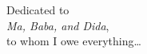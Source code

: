 \thispagestyle{empty}
{}

\vspace*{6cm}

\begin{center}
    Dedicated to \\
    \emph{Ma, Baba, and Dida},\\
    to whom I owe everything\ldots
\end{center}

\medskip
